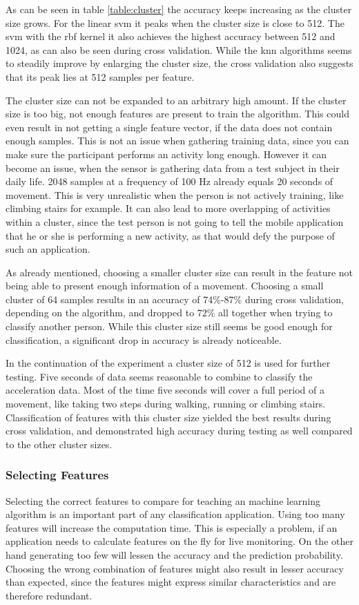 As can be seen in table \ref{table:cluster} the accuracy keeps increasing as the cluster size grows. For the linear \gls{svm} it peaks when the cluster size is close to 512. The \gls{svm} with the \gls{rbf} kernel it also achieves the highest accuracy between 512 and 1024, as can also be seen during cross validation. While the \gls{knn} algorithms seems to steadily improve by enlarging the cluster size, the cross validation also suggests that its peak lies at 512 samples per feature.

The cluster size can not be expanded to an arbitrary high amount. If the cluster size is too big, not enough features are present to train the algorithm. This could even result in not getting a single feature vector, if the data does not contain enough samples. This is not an issue when gathering training data, since you can make sure the participant performs an activity long enough. However it can become an issue, when the sensor is gathering data from a test subject in their daily life. 2048 samples at a frequency of 100 Hz already equals 20 seconds of movement. This is very unrealistic when the person is not actively training, like climbing stairs for example. It can also lead to more overlapping of activities within a cluster, since the test person is not going to tell the mobile application that he or she is performing a new activity, as that would defy the purpose of such an application.

As already mentioned, choosing a smaller cluster size can result in the feature not being able to present enough information of a movement. Choosing a small cluster of 64 samples results in an accuracy of 74\%-87\% during cross validation, depending on the algorithm, and dropped to 72\% all together when trying to classify another person. While this cluster size still seems be good enough for classification, a significant drop in accuracy is already noticeable.

In the continuation of the experiment a cluster size of 512 is used for further testing. Five seconds of data seems reasonable to combine to classify the acceleration data. Most of the time five seconds will cover a full period of a movement, like taking two steps during walking, running or climbing stairs. Classification of features with this cluster size yielded the best results during cross validation, and demonstrated high accuracy during testing as well compared to the other cluster sizes.


\subsubsection{Selecting Features}
Selecting the correct features to compare for teaching an machine learning algorithm is an important part of any classification application. Using too many features will increase the computation time. This is especially a problem, if an application needs to calculate features on the fly for live monitoring. On the other hand generating too few will lessen the accuracy and the prediction probability. Choosing the wrong combination of features might also result in lesser accuracy than expected, since the features might express similar characteristics and are therefore redundant.

